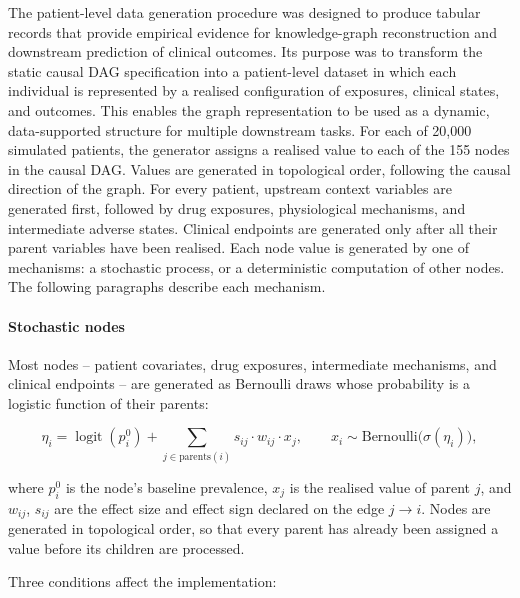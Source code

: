 The patient-level data generation procedure was designed to produce
tabular records that provide empirical evidence for knowledge-graph
reconstruction and downstream prediction of clinical outcomes. Its purpose
was to transform the static causal DAG specification into a patient-level
dataset in which each individual is represented by a realised configuration
of exposures, clinical states, and outcomes. This enables the graph
representation to be used as a dynamic, data-supported structure for
multiple downstream tasks.
For each of 20{,}000 simulated patients, the generator assigns a realised
value to each of the 155 nodes in the causal DAG. Values are generated in
topological order, following the causal direction of the graph. For every
patient, upstream context variables are generated first, followed by drug
exposures, physiological mechanisms, and intermediate adverse states.
Clinical endpoints are generated only after all their parent variables have
been realised.
Each node value is generated by one of mechanisms:
a stochastic process, or a deterministic computation of other nodes. The following paragraphs
describe each mechanism.

\paragraph{Stochastic nodes}
Most nodes -- patient covariates, drug exposures, intermediate mechanisms,
and clinical endpoints -- are generated as Bernoulli draws whose probability
is a logistic function of their parents:

\begin{equation}
\eta_i = \operatorname{logit}(p_i^{0}) + \sum_{j \in \mathrm{parents}(i)} s_{ij} \cdot w_{ij} \cdot x_j,
\qquad
x_i \sim \mathrm{Bernoulli}\big(\sigma(\eta_i)\big),
\end{equation}

where $p_i^{0}$ is the node's baseline prevalence, $x_j$ is the realised
value of parent $j$, and $w_{ij}$, $s_{ij}$ are the effect size and effect
sign declared on the edge $j \to i$. Nodes are generated in topological
order, so that every parent has already been assigned a value before its
children are processed.

Three conditions affect the implementation:

